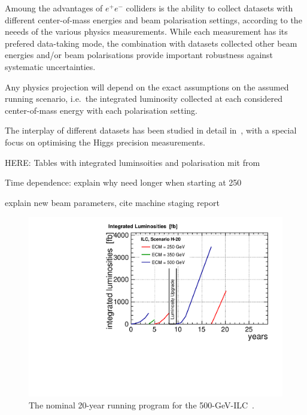 
Amoung the advantages of $e^+e^-$ colliders is the ability to collect datasets with different center-of-mass energies and beam polarisation settings, according to the neeeds of the various physics measurements.
While each measurement has its prefered data-taking mode, the combination with datasets collected other beam energies and/or beam polarisations provide important robustness against systematic uncertainties.

Any physics projection will depend on the exact assumptions on the assumed running scenario, i.e.\ the integrated luminosity collected at each considered center-of-mass energy with each polarisation setting.


The interplay of different datasets has been studied in detail in~\cite{Barklow:2015tja}, with a special focus on optimising the Higgs precision measurements. 

{\color{red} HERE: Tables with integrated luminsoities and polarisation mit from~\cite{Barklow:2015tja}}

{\color{red} Time dependence: explain why need longer when starting at 250\,\GeV}

{\color{red} explain new beam parameters, cite machine staging report}


\begin{figure}
\begin{center}
\includegraphics[width=0.75\hsize]{figs/lumi_H-20.pdf}
\end{center}
\caption{The nominal 20-year running program for the 500-GeV-ILC~\cite{Barklow:2015tja}.}
\label{fig:H20}
\end{figure}


